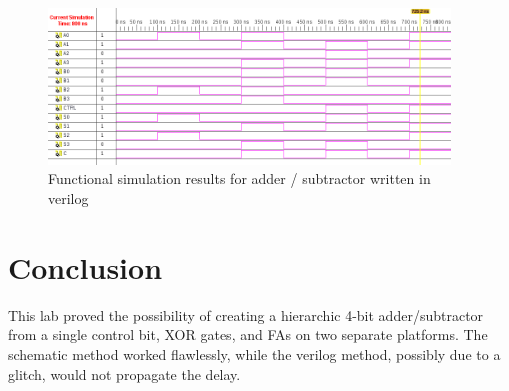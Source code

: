 \documentclass[11pt]{article}
\begin{document}
\begin{figure}[htpb]
	\centering
	\includegraphics[width=0.95\textwidth]{add_sub_test_verilog}
	\caption{Functional simulation results for adder / subtractor written in verilog}
	\label{fig:AS_verilog}
\end{figure}

\section{Conclusion}

This lab proved the possibility of creating a hierarchic 4-bit adder/subtractor from a single control bit, XOR gates, and FAs on two separate platforms. The schematic method worked flawlessly, while the verilog method, possibly due to a glitch, would not propagate the delay.
\end{document}
